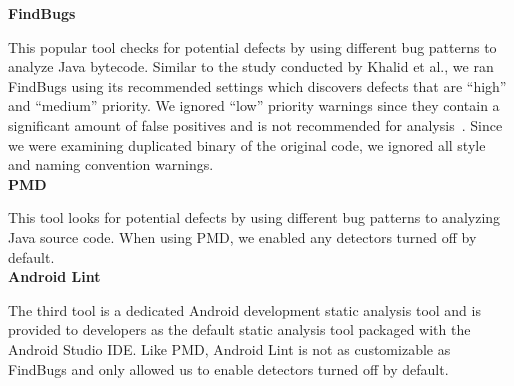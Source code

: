 \documentclass{sig-alternate}
\newcommand{\todo}[1]{\textcolor{cyan}{\textbf{[#1]}}}
\newcommand{\dan}[1]{\textcolor{blue}{{\it [Dan says: #1]}}}
\begin{document}
\noindent
\textbf{FindBugs}

This popular tool checks for potential defects by using different bug patterns to analyze Java bytecode. Similar to the study conducted by  Khalid et al.\cite{7006337}, we ran FindBugs using its recommended settings which discovers defects that are ``high'' and ``medium'' priority. We ignored ``low'' priority warnings since they contain a significant amount of false positives and is not recommended for analysis~\cite{FindBugs_URL}. Since we were examining duplicated binary of the original code, we ignored all style and naming convention warnings.\\








\noindent
\textbf{PMD}

This tool looks for potential defects by using different bug patterns to analyzing Java source code. When using PMD, we enabled any detectors turned off by default.\\

\noindent
\textbf{Android Lint}

The third tool is a dedicated Android development static analysis tool and is provided to developers as the default static analysis tool packaged with the Android Studio IDE. Like PMD, Android Lint is not as customizable as FindBugs and only allowed us to enable detectors turned off by default.


\end{document}
